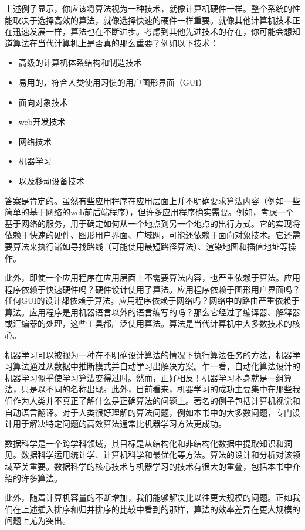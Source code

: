 \documentclass[lang=cn,newtx,10pt,scheme=chinese]{elegantbook}
\begin{document}
上述例子显示，你应该将算法视为一种技术，就像计算机硬件一样。整个系统的性能取决于选择高效的算法，就像选择快速的硬件一样重要。就像其他计算机技术正在迅速发展一样，算法也在不断进步。考虑到其他先进技术的存在，你可能会想知道算法在当代计算机上是否真的那么重要？例如以下技术：

\begin{itemize}
    \item 高级的计算机体系结构和制造技术
    \item 易用的，符合人类使用习惯的用户图形界面（GUI）
    \item 面向对象技术
    \item web开发技术
    \item 网络技术
    \item 机器学习
    \item 以及移动设备技术
\end{itemize}

答案是肯定的。虽然有些应用程序在应用层面上并不明确要求算法内容（例如一些简单的基于网络的web前后端程序），但许多应用程序确实需要。例如，考虑一个基于网络的服务，用于确定如何从一个地点到另一个地点的出行方式。它的实现将依赖于快速的硬件、图形用户界面、广域网，可能还依赖于面向对象技术。它还需要算法来执行诸如寻找路线（可能使用最短路径算法）、渲染地图和插值地址等操作。

此外，即使一个应用程序在应用层面上不需要算法内容，也严重依赖于算法。应用程序依赖于快速硬件吗？硬件设计使用了算法。应用程序依赖于图形用户界面吗？任何GUI的设计都依赖于算法。应用程序依赖于网络吗？网络中的路由严重依赖于算法。应用程序是用机器语言以外的语言编写的吗？那么它经过了编译器、解释器或汇编器的处理，这些工具都广泛使用算法。算法是当代计算机中大多数技术的核心。

机器学习可以被视为一种在不明确设计算法的情况下执行算法任务的方法，机器学习算法通过从数据中推断模式并自动学习出解决方案。乍一看，自动化算法设计的机器学习似乎使学习算法变得过时。然而，正好相反！机器学习本身就是一组算法，只是以不同的名称出现。此外，目前看来，机器学习的成功主要集中在那些我们作为人类并不真正了解什么是正确算法的问题上。著名的例子包括计算机视觉和自动语言翻译。对于人类很好理解的算法问题，例如本书中的大多数问题，专门设计用于解决特定问题的高效算法通常比机器学习方法更成功。

数据科学是一个跨学科领域，其目标是从结构化和非结构化数据中提取知识和洞见。数据科学运用统计学、计算机科学和最优化等方法。算法的设计和分析对该领域至关重要。数据科学的核心技术与机器学习的技术有很大的重叠，包括本书中介绍的许多算法。

此外，随着计算机容量的不断增加，我们能够解决比以往更大规模的问题。正如我们在上述插入排序和归并排序的比较中看到的那样，算法的效率差异在更大规模的问题上尤为突出。
\end{document}
